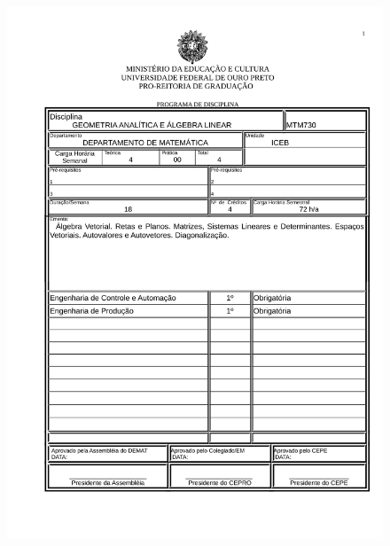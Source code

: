 \begin{figure}[p]
	\centering 
	\includegraphics[scale=0.7]{capitulos/anexo1-programas-disciplina/p15.pdf}
\end{figure}

